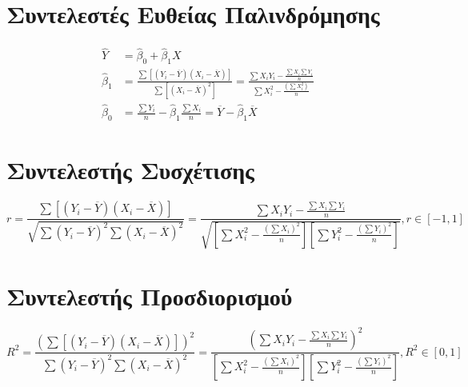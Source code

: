 



\section{Συντελεστές Ευθείας Παλινδρόμησης}

\begin{align*}
  \hat{Y}&=\hat{\beta}_{0}+\hat{\beta}_{1}X \\
  \hat{\beta}_{1}&=\frac{\sum[(Y_{i}-\overline{Y})(X_{i}-\overline{X})]}{\sum[(X_{i}-\overline{X})^{2}]} = \frac{\sum X_{i}Y_{i}-\frac{\sum X_{i}\sum Y_{i}}{n}}{\sum X_{i}^{2}-\frac{(\sum X_{i}^{2})}{n}} \\
  \hat{\beta}_{0}&=\frac{\sum Y_{i}}{n}-\hat{\beta}_{1}\frac{\sum X_{i}}{n}=\overline{Y}-\hat{\beta}_{1}\overline{X}
\end{align*}

\section{Συντελεστής Συσχέτισης}

\begin{equation*}
  r=\frac{\sum[(Y_{i}-\overline{Y})(X_{i}-\overline{X})]}{\sqrt{\sum(Y_{i}-\overline{Y})^{2}\sum(X_{i}-\overline{X})^{2}}} = \frac{\sum X_{i}Y_{i}-\frac{\sum X_{i}\sum Y_{i}}{n}}{\sqrt{[\sum X_{i}^{2}-\frac{(\sum X_{i})^{2}}{n}][\sum Y_{i}^{2}-\frac{(\sum Y_{i})^{2}}{n}]}},  r\in [-1,1]
\end{equation*}

\section{Συντελεστής Προσδιορισμού}

\begin{equation*}
  R^{2}=\frac{(\sum[(Y_{i}-\overline{Y})(X_{i}-\overline{X})])^{2}}{\sum(Y_{i}-\overline{Y})^{2}\sum(X_{i}-\overline{X})^{2}} = \frac{(\sum X_{i}Y_{i}-\frac{\sum X_{i}\sum Y_{i}}{n})^{2}}{[\sum X_{i}^{2}-\frac{(\sum X_{i})^{2}}{n}][\sum Y_{i}^{2}-\frac{(\sum Y_{i})^{2}}{n}]},  R^{2}\in [0,1]
\end{equation*}
